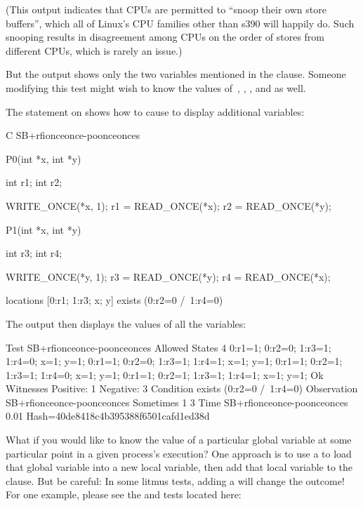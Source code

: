 (This output indicates that CPUs are permitted to ``snoop their own
store buffers'', which all of Linux's CPU families other than s390 will
happily do.
Such snooping results in disagreement among CPUs on the order of stores
from different CPUs, which is rarely an issue.)

But the  output shows only the two variables mentioned in the
 clause.
Someone modifying this test might wish to know the values of~,
, , and  as well.
\begin{fcvref}
The  statement on  shows how to cause  to
display additional variables:
\end{fcvref}

\begin{fcvlabel}
\begin{VerbatimN}[commandchars=\%\@\$]
	C SB+rfionceonce-poonceonces

	{}

	P0(int *x, int *y)
	{
		int r1;
		int r2;

		WRITE_ONCE(*x, 1);
		r1 = READ_ONCE(*x);
		r2 = READ_ONCE(*y);
	}

	P1(int *x, int *y)
	{
		int r3;
		int r4;

		WRITE_ONCE(*y, 1);
		r3 = READ_ONCE(*y);
		r4 = READ_ONCE(*x);
	}

	locations [0:r1; 1:r3; x; y]    %
	exists (0:r2=0 /\ 1:r4=0)
\end{VerbatimN}
\end{fcvlabel}

The  output then displays the values of all the variables:

\begin{VerbatimN}
	Test SB+rfionceonce-poonceonces Allowed
	States 4
	0:r1=1; 0:r2=0; 1:r3=1; 1:r4=0; x=1; y=1;
	0:r1=1; 0:r2=0; 1:r3=1; 1:r4=1; x=1; y=1;
	0:r1=1; 0:r2=1; 1:r3=1; 1:r4=0; x=1; y=1;
	0:r1=1; 0:r2=1; 1:r3=1; 1:r4=1; x=1; y=1;
	Ok
	Witnesses
	Positive: 1 Negative: 3
	Condition exists (0:r2=0 /\ 1:r4=0)
	Observation SB+rfionceonce-poonceonces Sometimes 1 3
	Time SB+rfionceonce-poonceonces 0.01
	Hash=40de8418c4b395388f6501cafd1ed38d
\end{VerbatimN}

What if you would like to know the value of a particular global variable
at some particular point in a given process's execution?
One approach is to use a  to load that global variable
into a new local variable, then add that local variable to the 
clause.
But be careful:
In some litmus tests, adding a  will change the outcome!
For one example, please see the  and
 tests located here:

